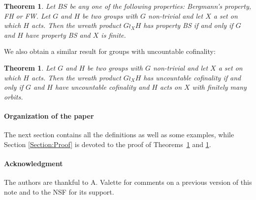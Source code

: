 \documentclass[a4paper]{article}
\newtheorem{thm}[lem]{Theorem}
\theoremstyle{definition}
\theoremstyle{remark}%
\begin{document}
\begin{thm}\label{Thm:Main}
Let $BS$ be any one of the following properties: Bergmann's property, FH or FW.
Let $G$ and $H$ be two groups with $G$ non-trivial and let $X$ a set on which $H$ acts. Then the wreath product $G \wr_X H$ has property BS if and only if $G$ and $H$ have property BS and $X$ is finite.
\end{thm}
We also obtain a similar result for groups with uncountable cofinality:
\begin{thm}\label{Thm:UncCoun}
Let $G$ and $H$ be two groups with $G$ non-trivial and let $X$ a set on which $H$ acts. Then the wreath product $G \wr_X H$ has uncountable cofinality if and only if $G$ and $H$ have uncountable cofinality and $H$ acts on $X$ with finitely many orbits.
\end{thm}
%
%
%
%
\paragraph{Organization of the paper}
The next section contains all the definitions as well as some examples, while Section \ref{Section:Proof} is devoted to the proof of Theorems~\ref{Thm:Main} and \ref{Thm:UncCoun}.
%
%
%
\paragraph{Acknowledgment}
The authors are thankful to A. Valette for comments on a previous version of this note and to the NSF for its support.
%
%
%
\end{document}
